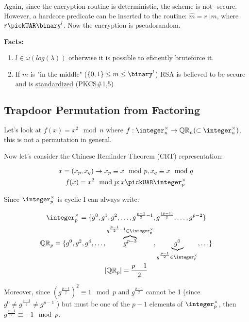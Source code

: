 Again, since the encryption routine is deterministic, the scheme is not \cpa-secure. However, a hardcore predicate can be inserted to the routine: $\hat{m} = r||m$, where $r \pickUAR \binary^l$. Now the encryption is pseudorandom.

\textbf{Facts:}
\begin{enumerate}
    \item $l \in \omega(log(\lambda))$ otherwise it is possible to eficiently bruteforce it.
    \item If $m$ is "in the middle" ($\{0,1\} \leq m \leq \binary^l$) RSA is believed to be secure and is \underline{standardized} (PKCS\#1,5)
\end{enumerate}


\subsection{Trapdoor Permutation from Factoring}
Let's look at $f(x) = x^2\mod{n}$ where $f: \integer_n^\times \to \QR[n] (\subset \integer_n^\times)$, this is not a permutation in general.

Now let's consider the Chinese Reminder Theorem (CRT) representation:

\begin{gather*}
    x=(x_p,x_q) \rightarrow x_p\equiv x\mod{p} , x_q\equiv x\mod{q}\\
    f(x)=x^2\mod{p}; x \pickUAR \integer_p^\times
\end{gather*}

Since $\integer_p^\times$ is cyclic I can always write:

\begin{gather*}
    \integer_p^\times = \{g^0,g^1,g^2,\ldots,g^{\frac{p-1}{2}-1},g^{\frac{(p-1)}{2}},\ldots,g^{p-2} \} \\
    \QR[p]=\{g^0,g^2,g^4,\ldots,\overbrace{g^{p-3}}^{g^{\frac{p-1}{2}-1} \in \integer_p^\times},\underbrace{g^0}_{g^{\frac{p-1}{2}} \in \integer_p^\times},\ldots\} \\
    |\QR[p]|=\frac{p-1}{2}
\end{gather*}

Moreover, since $(g^{\frac{p-1}{2}})^2 \equiv 1 \mod{p} $ and $g^{\frac{p-1}{2}}$ cannot be 1 (since $g^{0}\not=g^{\frac{p-1}{2}}\not=g^{p-1}$ ) but must be one of the $p-1$ elements of $\integer_p^\times$, then $g^{\frac{p-1}{2}} \equiv -1 \mod{p}$.

